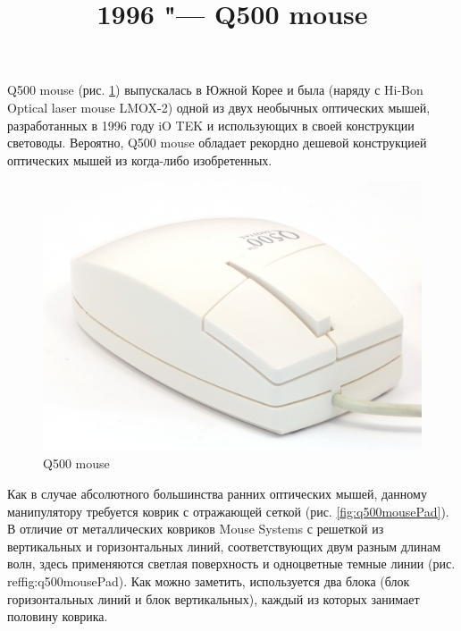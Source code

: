 \documentclass[11pt, a4paper]{article}
\begin{document}
\title{1996 "--- Q500 mouse}
\date{}
\maketitle
{}
    Q500 mouse (рис. \ref{fig:q500mousePic}) выпускалась в Южной Корее и была (наряду с Hi-Bon Optical laser mouse LMOX-2) одной из двух необычных оптических мышей, разработанных в 1996 году iO TEK и использующих в своей конструкции световоды. Вероятно, Q500 mouse обладает рекордно дешевой конструкцией оптических мышей из когда-либо изобретенных.

\begin{figure}[h]
    \centering
    \includegraphics[scale=0.5]{1996_q500_mouse/pic_30.jpg}
    \caption{Q500 mouse}
    \label{fig:q500mousePic}
\end{figure}

Как в случае абсолютного большинства ранних оптических мышей, данному манипулятору требуется коврик с отражающей сеткой (рис. \ref{fig:q500mousePad}). В отличие от металлических ковриков Mouse Systems с решеткой из вертикальных и горизонтальных линий, соответствующих двум разным длинам волн, здесь применяются светлая поверхность и одноцветные темные линии (рис. ref{fig:q500mousePad}). Как можно заметить, используется два блока (блок горизонтальных линий и блок вертикальных), каждый из которых занимает половину коврика.
\end{document}
